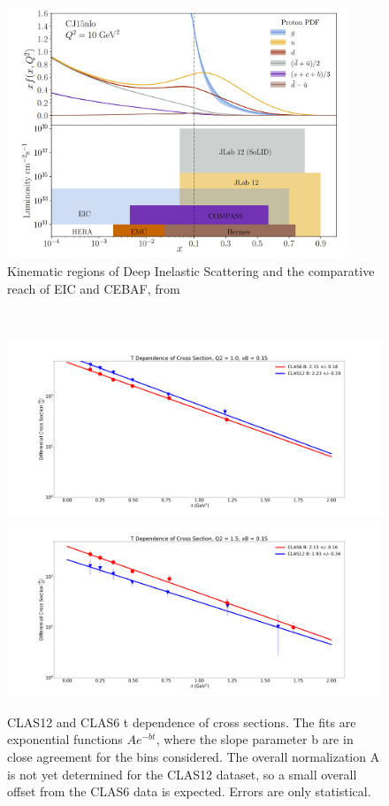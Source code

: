     \begin{figure}
        \centering
        \includegraphics[width=0.9\textwidth]{Chapters/Ch5-Further/X_conclusion/pics/future.png}
        \caption[Kinematic Overlap of Future Experiments]{Kinematic regions of Deep Inelastic Scattering and the comparative reach of EIC and CEBAF, from \parencite{Arrington2022PhysicsOpportunities} }
        \label{fig:physics_future_ranges}
    \end{figure}












\iffalse

    \
    \begin{figure}[hbt]
    	\centering
    	\includegraphics[page=125,width=0.45\linewidth]{Chapters/Ch5-Further/t_dependence/pics/fig_1.0_0.15.png}
    	\includegraphics[page=130,width=0.45\linewidth]{Chapters/Ch5-Further/t_dependence/pics/fig_1.5_0.15.png}
    
    	\caption[t dependence]{CLAS12 and CLAS6 t dependence of cross sections. The fits are exponential functions $Ae^{-bt}$, where the slope parameter b are in close agreement for the bins considered. The overall normalization A is not yet determined for the CLAS12 dataset, so a small overall offset from the CLAS6 data is expected. Errors are only statistical.}
    	\label{fig:tdep}
    \end{figure}
    \

